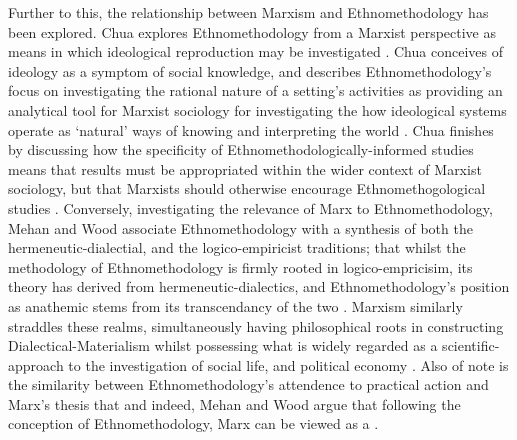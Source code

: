 Further to this, the relationship between Marxism and Ethnomethodology has been explored. Chua explores Ethnomethodology from a Marxist perspective as means in which ideological reproduction may be investigated \cite{chua_delineating_1977}. Chua conceives of ideology as a symptom of social knowledge, and describes Ethnomethodology's focus on investigating the rational nature of a setting's activities as providing an analytical tool for Marxist sociology for investigating the how ideological systems operate as `natural' ways of knowing and interpreting the world \cite{chua_delineating_1977}. Chua finishes by discussing how the specificity of Ethnomethodologically-informed studies means that results must be appropriated within the wider context of Marxist sociology, but that Marxists should otherwise encourage Ethnomethogological studies \cite{chua_delineating_1977}. Conversely, investigating the relevance of Marx to Ethnomethodology, Mehan and Wood associate Ethnomethodology with a synthesis of both the hermeneutic-dialectial, and the logico-empiricist traditions; that whilst the methodology of Ethnomethodology is firmly rooted in logico-empricisim, its theory has derived from hermeneutic-dialectics, and Ethnomethodology's position as anathemic stems from its transcendancy of the two \cite{mehan_morality_1975}. Marxism similarly straddles these realms, simultaneously having philosophical roots in constructing Dialectical-Materialism whilst possessing what is widely regarded as a scientific-approach to the investigation of social life, and political economy \cite{thomas_marxism_2008}. Also of note is the similarity between Ethnomethodology's attendence to practical action \cite{garfinkel_studies_1967, crabtree_doing_2012} and Marx's thesis that  \cite{marx_theses_1963} and indeed, Mehan and Wood argue that following the conception of Ethnomethodology, Marx can be viewed as a  \cite{mehan_morality_1975}.









